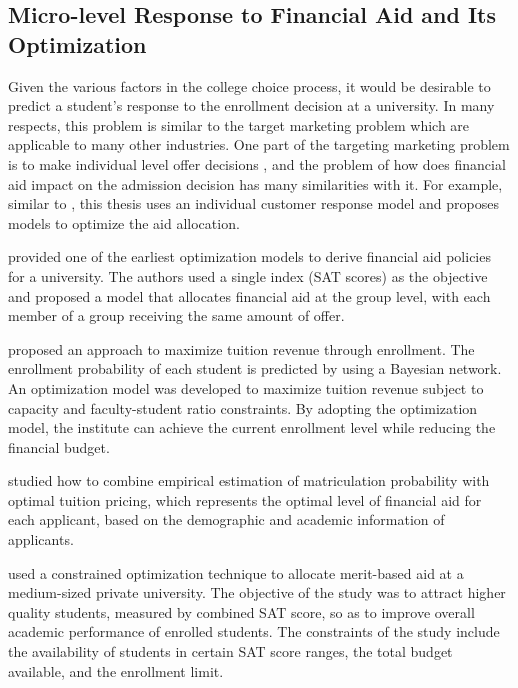 \documentclass[12pt,english]{report}
\begin{document}
\subsection{Micro-level Response to Financial Aid and Its Optimization} 
Given the various factors in the college choice process, it would be desirable to predict a student's response 
to the enrollment decision at a university.  In many respects, this problem is similar to the target marketing 
problem which are applicable to many other industries. One part of the targeting marketing problem is to 
make individual level offer decisions \citep{Venkatesan2004}, and the problem of how does financial aid 
impact on the admission decision has many similarities with it.  For example, similar to \citep{Carter2011}, 
this thesis uses an individual customer response model and proposes  models to optimize the aid 
allocation.

\vspace{0.15in}

\citet{Ehrenberg1984} provided one of the earliest optimization models to derive financial aid policies for a university. The authors used a single index (SAT scores) as the objective and proposed a model that allocates financial aid at the group level, with each member of a group receiving the same amount of offer. 

\citet{Thanh2007} proposed an approach to maximize tuition revenue  through enrollment. The enrollment probability  of each student is predicted by using a Bayesian network.  An optimization model was developed to  maximize  tuition revenue subject to capacity and faculty-student ratio constraints. By adopting the optimization model, the institute  can achieve the current enrollment level while reducing the financial budget.

\citet{Bosshardt2010} studied how to combine empirical estimation of matriculation probability with optimal tuition pricing, which represents the optimal level of financial aid for each applicant, based on the demographic  and academic information of applicants.

\citet{Sugrue2010} used a constrained optimization technique to allocate merit-based aid at a medium-sized private university. The objective of the study was to attract higher quality students, measured by combined SAT score,  so as to improve overall academic performance of enrolled students. The constraints of the study include the availability of students in certain SAT score ranges, the total budget available, and the enrollment limit.
\end{document}
